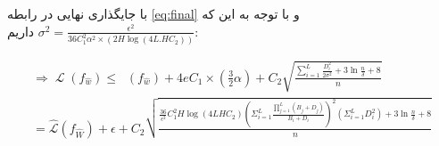 \documentclass{article}
\DeclareMathOperator{\Lossh}{\hat{\mathcal{L}}}
\DeclareMathOperator{\Loss}{\mathcal{L}}
\begin{document}
\begin{enumerate}
با جایگذاری نهایی در رابطه 
\ref{eq:final}
و با توجه به این که
$\sigma^2 = \frac
{\epsilon^2}
{36C^2_1 \alpha^2 \times (2H \log (4L.HC_2))}$
داریم:

\begin{subequations}
\begin{alignat}{2}
    \Rightarrow
    \Loss(f_{\hat{w}}) \leq \Lossh(f_{\hat{w}}) + 
    4e C_1 \times (\frac{3}{2} \alpha)  +  C_2 \sqrt{\frac
    {\sum_{i=1}^L \frac{D_i^2}{2\sigma^2} + 3 \ln {\frac{n}{\delta}} + 8}
    {n}} \\ = \hat{\mathcal{L}}(f_{\hat{W}}) + \epsilon + C_2\sqrt{\frac{\frac{36}{\epsilon^2}C_1^{2}H\log{(4LHC_2)}(\Sigma^{L}_{i = 1}\frac{\prod^{L}_{j = 1}(B_j + D_j)}{B_i + D_i})^2(\Sigma^{L}_{i = 1}D_i^2) + 3\ln \frac{n}{\delta} + 8}{n}}
\end{alignat}
\end{subequations}

\end{enumerate}
\fi

\end{document}
